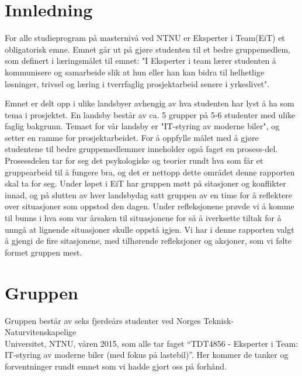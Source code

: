 \chapter{Innledning}
For alle studieprogram på masternivå ved NTNU er Eksperter i Team(EiT) et obligatorisk emne. Emnet går ut på gjøre 
studenten til et bedre gruppemedlem, som definert i læringsmålet til emnet: "I Eksperter i team lærer studenten å 
kommunisere og samarbeide slik at hun eller han kan
bidra til helhetlige løsninger, trivsel og læring i tverrfaglig prosjektarbeid senere i yrkeslivet". 

Emnet er delt opp i ulike landsbyer avhengig av hva studenten har lyst å ha som tema i prosjektet. En landsby består 
av ca. 5 grupper på 5-6 studenter med ulike faglig bakgrunn. Temaet for vår landsby er "IT-styring av moderne 
biler", og setter en ramme for prosjektarbeidet. For å oppfylle målet med å gjøre studentene til bedre gruppemedlemmer 
inneholder også faget en prosess-del. Prosessdelen tar for seg det psykologiske og teorier rundt hva som får 
et gruppearbeid til å fungere bra, og det er nettopp dette området denne rapporten skal ta for seg. 
Under løpet i EiT har gruppen møtt på sitasjoner og konflikter innad, og på slutten av 
hver landsbydag satt gruppen av en time for å reflektere over situasjoner som oppstod den dagen. Under refleksjonene 
prøvde vi å komme til bunns i hva som var årsaken til situasjonene for så å iverksette tiltak for å unngå 
at lignende situasjoner skulle oppstå igjen. Vi har i denne rapporten valgt å gjengi de fire sitasjonene, med tilhørende 
refleksjoner og aksjoner, som vi følte formet gruppen mest.




\chapter{Gruppen} 
Gruppen består av seks fjerdeårs studenter ved Norges Teknisk-
Naturvitenskapelige\\Universitet, NTNU, våren 2015, som alle tar faget ``TDT4856 
- Eksperter i Team: IT-styring av moderne biler (med fokus på lastebil)''.	 Her kommer de tanker og forventninger
rundt emnet som vi hadde gjort oss på forhånd.

